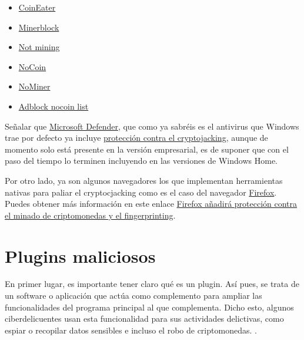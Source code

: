 \documentclass[
  a4paper,
  openany]{book}
\begin{document}
\begin{itemize}
\item
  \href{https://github.com/fhstp/CoinEater}{CoinEater}
\item
  \href{https://github.com/xd4rker/MinerBlock}{Minerblock}
\item
  \href{https://notmining.es}{Not mining}
\item
  \href{https://github.com/keraf/NoCoin}{NoCoin}
\item
  \href{https://chrome.google.com/webstore/detail/nominer-block-coin-miners/jfnangjojcioomickmmnfmiadkfhcdmd}{NoMiner}
\item
  \href{https://github.com/hoshsadiq/adblock-nocoin-list}{Adblock nocoin list}
\end{itemize}

Señalar que \href{https://www.microsoft.com/es-es/windows/comprehensive-security}{Microsoft Defender}, que como ya sabréis es el antivirus que Windows trae por defecto ya incluye \href{https://www.microsoft.com/security/blog/2021/04/26/defending-against-cryptojacking-with-microsoft-defender-for-endpoint-and-intel-tdt/}{protección contra el cryptojacking}, aunque de momento solo está presente en la versión empresarial, es de suponer que con el paso del tiempo lo terminen incluyendo en las versiones de Windows Home.

Por otro lado, ya son algunos navegadores los que implementan herramientas nativas para paliar el cryptocjacking como es el caso del navegador \href{https://www.mozilla.org/es-ES/firefox/browsers/}{Firefox}. Puedes obtener más información en este enlace \href{https://www.genbeta.com/navegadores/firefox-anadira-proteccion-minado-criptomonedas-fingerprinting}{Firefox añadirá protección contra el minado de criptomonedas y el fingerprinting}.

\hypertarget{plugins-maliciosos}{%
\section{Plugins maliciosos}\label{plugins-maliciosos}}

En primer lugar, es importante tener claro qué es un plugin. Así pues, se trata de un software o aplicación que actúa como complemento para ampliar las funcionalidades del programa principal al que complementa. Dicho esto, algunos ciberdelicuentes usan esta funcionalidad para sus actividades delictivas, como espiar o recopilar datos sensibles e incluso el robo de criptomonedas. \citep{IONOS-plugin}.
\end{document}
